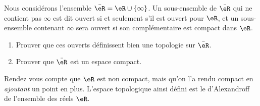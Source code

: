 
\begin{exercice}\label{exo0088}

Nous considérons l'ensemble $\bar\eR=\eR\cup\{\infty\}$. Un sous-ensemble de $\bar\eR$ qui ne contient pas $\infty$ est dit ouvert si et seulement s'il est ouvert pour $\eR$, et un sous-ensemble contenant $\infty$ sera ouvert si son complémentaire est compact dans $\eR$.

\begin{enumerate}

\item
Prouver que ces ouverts définissent bien une topologie sur $\bar\eR$.

\item
Prouver que $\bar\eR$ est un espace compact.

\end{enumerate}
Rendez vous compte que $\eR$ est non compact, mais qu'on l'a rendu compact en \emph{ajoutant} un point en plus. L'espace topologique ainsi défini est le  d'Alexandroff de l'ensemble des réels $\eR$.

\end{exercice}
